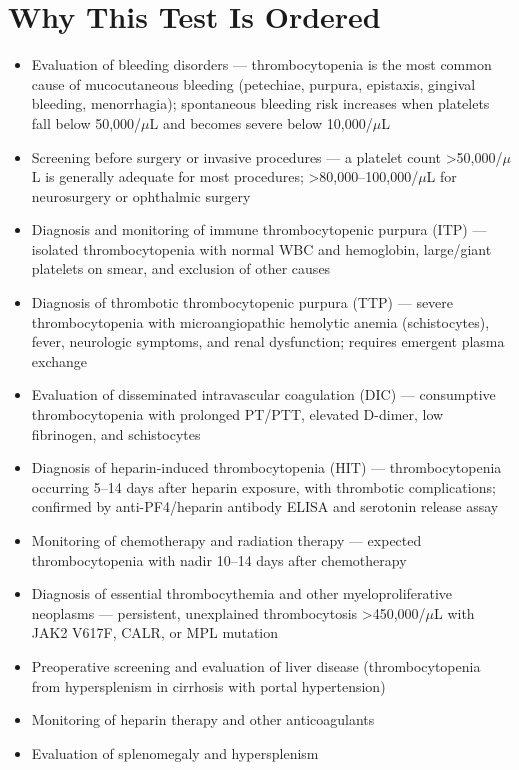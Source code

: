 \section*{Why This Test Is Ordered}
\begin{itemize}
  \item Evaluation of bleeding disorders --- thrombocytopenia is the most common cause of mucocutaneous bleeding (petechiae, purpura, epistaxis, gingival bleeding, menorrhagia); spontaneous bleeding risk increases when platelets fall below 50,000/$\mu$L and becomes severe below 10,000/$\mu$L
  \item Screening before surgery or invasive procedures --- a platelet count >50,000/$\mu$L is generally adequate for most procedures; >80,000--100,000/$\mu$L for neurosurgery or ophthalmic surgery
  \item Diagnosis and monitoring of immune thrombocytopenic purpura (ITP) --- isolated thrombocytopenia with normal WBC and hemoglobin, large/giant platelets on smear, and exclusion of other causes
  \item Diagnosis of thrombotic thrombocytopenic purpura (TTP) --- severe thrombocytopenia with microangiopathic hemolytic anemia (schistocytes), fever, neurologic symptoms, and renal dysfunction; requires emergent plasma exchange
  \item Evaluation of disseminated intravascular coagulation (DIC) --- consumptive thrombocytopenia with prolonged PT/PTT, elevated D-dimer, low fibrinogen, and schistocytes
  \item Diagnosis of heparin-induced thrombocytopenia (HIT) --- thrombocytopenia occurring 5--14 days after heparin exposure, with thrombotic complications; confirmed by anti-PF4/heparin antibody ELISA and serotonin release assay
  \item Monitoring of chemotherapy and radiation therapy --- expected thrombocytopenia with nadir 10--14 days after chemotherapy
  \item Diagnosis of essential thrombocythemia and other myeloproliferative neoplasms --- persistent, unexplained thrombocytosis >450,000/$\mu$L with JAK2 V617F, CALR, or MPL mutation
  \item Preoperative screening and evaluation of liver disease (thrombocytopenia from hypersplenism in cirrhosis with portal hypertension)
  \item Monitoring of heparin therapy and other anticoagulants
  \item Evaluation of splenomegaly and hypersplenism
\end{itemize}


